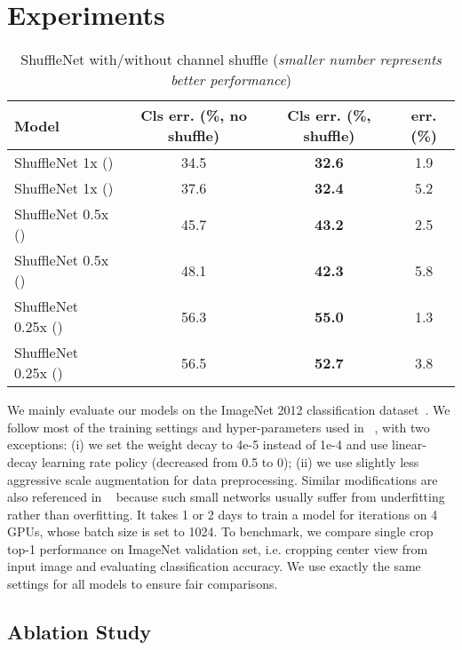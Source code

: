 \documentclass[10pt,twocolumn,letterpaper]{article}
\begin{document}
\section{Experiments}
\label{sec:exp}

\begin{table*}[ht]
	\begin{center}
		\begin{tabular}{l|c|c|c}
			\hline
			Model & Cls err. (\%, no shuffle) & Cls err. (\%, shuffle) &  err. (\%) \\
			\hline \hline
			ShuffleNet 1x () & 34.5 & \textbf{32.6} & 1.9 \\
			ShuffleNet 1x () & 37.6 & \textbf{32.4} & 5.2 \\
			\hline
			ShuffleNet 0.5x () & 45.7 & \textbf{43.2} & 2.5 \\
			ShuffleNet 0.5x () & 48.1 & \textbf{42.3} & 5.8 \\
			\hline
			ShuffleNet 0.25x () & 56.3 & \textbf{55.0} & 1.3 \\
			ShuffleNet 0.25x () & 56.5 & \textbf{52.7} & 3.8 \\
			\hline
		\end{tabular}
	\end{center}
	\caption{ShuffleNet with/without channel shuffle (\emph{smaller number represents better performance})}
	\label{tbl:shuffle}
\end{table*}



We mainly evaluate our models on the ImageNet 2012 classification dataset~\cite{russakovsky2015imagenet,deng2009imagenet}. We follow most of the training settings and hyper-parameters used in ~\cite{xie2016aggregated}, with two exceptions: (i) we set the weight decay to 4e-5 instead of 1e-4 and use linear-decay learning rate policy (decreased from 0.5 to 0); (ii) we use slightly less aggressive scale augmentation for data preprocessing. Similar modifications are also referenced in ~\cite{howard2017mobilenets} because such small networks usually suffer from underfitting rather than overfitting. It takes 1 or 2 days to train a model for  iterations on 4 GPUs, whose batch size is set to 1024. To benchmark, we compare single crop top-1 performance on ImageNet validation set, i.e. cropping  center view from  input image and evaluating classification accuracy. We use exactly the same settings for all models to ensure fair comparisons.

\subsection{Ablation Study}
\end{document}
